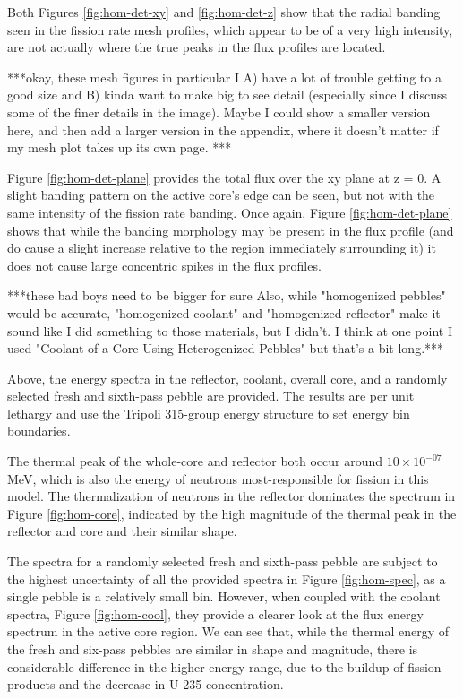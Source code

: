 Both Figures \ref{fig:hom-det-xy} and \ref{fig:hom-det-z} show that the radial banding seen in the fission rate mesh profiles, which appear to be of a very high intensity, are not actually where the true peaks in the flux profiles are located.




***okay, these mesh figures in particular I A) have a lot of trouble getting to a good size and B) kinda want to make big to see detail (especially since I discuss some of the finer details in the image).  Maybe I could show a smaller version here, and then add a larger version in the appendix, where it doesn't matter if my mesh plot takes up its own page. ***

Figure \ref{fig:hom-det-plane} provides the total flux over the xy plane at z = 0.  A slight banding pattern on the active core's edge can be seen, but not with the same intensity of the fission rate banding.  Once again, Figure \ref{fig:hom-det-plane} shows that while the banding morphology may be present in the flux profile (and do cause a slight increase relative to the region immediately surrounding it) it does not cause large concentric spikes in the flux profiles.



***these bad boys need to be bigger for sure  Also, while "homogenized pebbles" would be accurate, "homogenized coolant" and "homogenized reflector" make it sound like I did something to those materials, but I didn't.  I think at one point I used "Coolant of a Core Using Heterogenized Pebbles" but that's a bit long.***

Above, the energy spectra in the reflector, coolant, overall core, and a randomly selected fresh and sixth-pass pebble are provided.  The results are per unit lethargy and use the Tripoli 315-group energy structure to set energy bin boundaries.

The thermal peak of the whole-core and reflector both occur around $10\times10^{-07}$ MeV, which is also the energy of neutrons most-responsible for fission in this model.  The thermalization of neutrons in the reflector dominates the spectrum in Figure \ref{fig:hom-core}, indicated by the high magnitude of the thermal peak in the reflector and core and their similar shape.

The spectra for a randomly selected fresh and sixth-pass pebble are subject to the highest uncertainty of all the provided spectra in Figure \ref{fig:hom-spec}, as a single pebble is a relatively small bin.  However, when coupled with the coolant spectra, Figure \ref{fig:hom-cool}, they provide a clearer look at the flux energy spectrum in the active core region.  We can see that, while the thermal energy of the fresh and six-pass pebbles are similar in shape and magnitude, there is considerable difference in the higher energy range, due to the buildup of fission products and the decrease in U-235 concentration.


